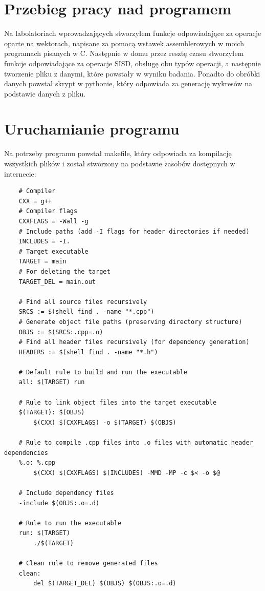\documentclass{article}
\begin{document}
\section{Przebieg pracy nad programem}

Na labolatoriach wprowadzających stworzyłem funkcje odpowiadające za operacje oparte na wektorach, napisane za pomocą wstawek assemblerowych w moich programach pisanych w C.
Następnie w domu przez resztę czasu stworzyłem funkcje odpowiadające za operacje SISD, obsługę obu typów operacji, a następnie tworzenie pliku z danymi, które powstały w wyniku badania.
Ponadto do obróbki danych powstał skrypt w pythonie, który odpowiada za generację wykresów na podstawie danych z pliku.

\section{Uruchamianie programu}

Na potrzeby programu powstał makefile, który odpowiada za kompilację wszystkich plików i został stworzony na podstawie 
zasobów dostępnych w internecie:

\begin{verbatim}
    # Compiler
    CXX = g++
    # Compiler flags
    CXXFLAGS = -Wall -g
    # Include paths (add -I flags for header directories if needed)
    INCLUDES = -I.
    # Target executable
    TARGET = main
    # For deleting the target
    TARGET_DEL = main.out
    
    # Find all source files recursively
    SRCS := $(shell find . -name "*.cpp")
    # Generate object file paths (preserving directory structure)
    OBJS := $(SRCS:.cpp=.o)
    # Find all header files recursively (for dependency generation)
    HEADERS := $(shell find . -name "*.h")
    
    # Default rule to build and run the executable
    all: $(TARGET) run
    
    # Rule to link object files into the target executable
    $(TARGET): $(OBJS)
        $(CXX) $(CXXFLAGS) -o $(TARGET) $(OBJS)
    
    # Rule to compile .cpp files into .o files with automatic header dependencies
    %.o: %.cpp
        $(CXX) $(CXXFLAGS) $(INCLUDES) -MMD -MP -c $< -o $@
    
    # Include dependency files
    -include $(OBJS:.o=.d)
    
    # Rule to run the executable
    run: $(TARGET)
        ./$(TARGET)
    
    # Clean rule to remove generated files
    clean:
        del $(TARGET_DEL) $(OBJS) $(OBJS:.o=.d)
\end{verbatim}
\end{document}
